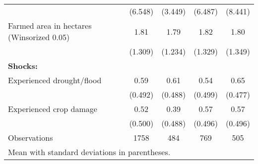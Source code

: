 {\begin{tabular}{l*{4}{c}}
                    &     (6.548)         &     (3.449)         &     (6.487)         &     (8.441)         \\
[1em]
Farmed area in hectares (Winsorized 0.05)&        1.81         &        1.79         &        1.82         &        1.80         \\
                    &     (1.309)         &     (1.234)         &     (1.329)         &     (1.349)         \\
[1em]
\textbf{Shocks:}    &                     &                     &                     &                     \\
[1em]
Experienced drought/flood&        0.59         &        0.61         &        0.54         &        0.65         \\
                    &     (0.492)         &     (0.488)         &     (0.499)         &     (0.477)         \\
[1em]
Experienced crop damage&        0.52         &        0.39         &        0.57         &        0.57         \\
                    &     (0.500)         &     (0.488)         &     (0.496)         &     (0.496)         \\
\hline
Observations        &        1758         &         484         &         769         &         505         \\
\hline\hline
\multicolumn{5}{l}{\footnotesize Mean with standard deviations in parentheses.}\\
\end{tabular}
}

